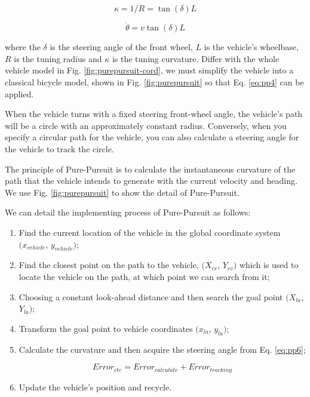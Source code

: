 \begin{equation} \label{eq:pp4}
\kappa = 1/R = \tan(\delta)L 
\end{equation}

\begin{equation} \label{eq:pp5}
\dot{\theta} = v \tan(\delta)L
\end{equation}

where the $\delta$ is the steering angle of the front wheel, $L$ is the vehicle's wheelbase, $R$ is the tuning radius and $\kappa$ is the tuning curvature. Differ with the whole vehicle model in Fig. \ref{fig:purepursuit-cord}, we must simplify the vehicle into a classical bicycle model, shown in Fig. \ref{fig:purepursuit} so that Eq. \ref{eq:pp4} can be applied.

When the vehicle turns with a fixed steering front-wheel angle, the vehicle's path will be a circle with an approximately constant radius. Conversely, when you specify a circular path for the vehicle, you can also calculate a steering angle for the vehicle to track the circle. 

The principle of Pure-Pursuit is to calculate the instantaneous curvature of the path that the vehicle intends to generate with the current velocity and heading. We use Fig. \ref{fig:purepursuit} to show the detail of Pure-Pursuit.

We can detail the implementing process of Pure-Pursuit as follows:

\begin{enumerate}
\item Find the current location of the vehicle in the global coordinate system $(x_{vehicle}$, $y_{vehicle})$;
\item Find the closest point on the path to the vehicle, $(X_{cv}$, $Y_{cv})$ which is used to locate the vehicle on the path, at which point we can search from it;
\item Choosing a constant look-ahead distance and then search the goal point $(X_{la}$, $Y_{la})$;
\item Transform the goal point to vehicle coordinates $(x_{la}$, $y_{la})$;
\item Calculate the curvature and then acquire the steering angle from Eq. \ref{eq:pp6};

\begin{equation} \label{eq:pp6}
Error_{cte} = Error_{calculate} + Error_{tracking}
\end{equation}

\item Update the vehicle's position and recycle.
\end{enumerate}

